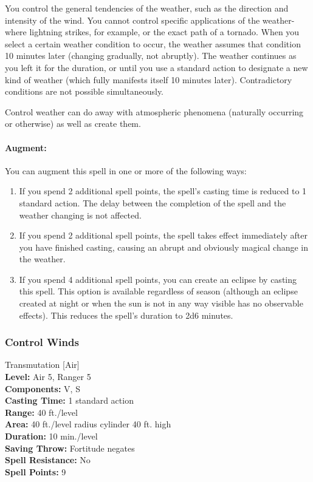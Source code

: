 You control the general tendencies of the weather, such as the direction and intensity of the wind. 
You cannot control specific applications of the weather-where lightning strikes, for example, or the exact path of a tornado. 
When you select a certain weather condition to occur, the weather assumes that condition 10 minutes later (changing gradually, not abruptly). 
The weather continues as you left it for the duration, 
or until you use a standard action to designate a new kind of weather (which fully manifests itself 10 minutes later). 
Contradictory conditions are not possible simultaneously.

Control weather can do away with atmospheric phenomena (naturally occurring or otherwise) as well as create them.

\paragraph{Augment:} You can augment this spell in one or more of the following ways:
\begin{enumerate}
 \item If you spend 2 additional spell points, the spell's casting time is reduced to 1 standard action.
 The delay between the completion of the spell and the weather changing is not affected.
 \item If you spend 2 additional spell points, the spell takes effect immediately after you have finished casting,
 causing an abrupt and obviously magical change in the weather.
 \item If you spend 4 additional spell points, you can create an eclipse by casting this spell.
 This option is available regardless of season (although an eclipse created at night or when the sun is not in any way visible has no observable effects).
 This reduces the spell's duration to 2d6 minutes.
\end{enumerate}

\subsubsection{Control Winds}
\label{Spell:ControlWinds}
Transmutation [Air]
\\ \textbf{Level:} Air 5, Ranger 5
\\ \textbf{Components:} V, S
\\ \textbf{Casting Time:} 1 standard action
\\ \textbf{Range:} 40 ft./level
\\ \textbf{Area:} 40 ft./level radius cylinder 40 ft. high
\\ \textbf{Duration:} 10 min./level
\\ \textbf{Saving Throw:} Fortitude negates
\\ \textbf{Spell Resistance:} No
\\ \textbf{Spell Points:} 9

